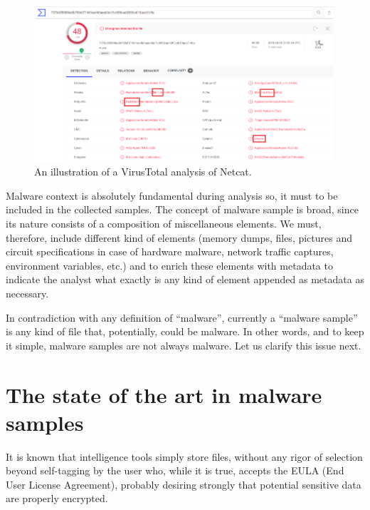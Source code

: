 \begin{figure}
  \centering
  \includegraphics[width=0.99\textwidth]{./figures/Image1.png}
  \caption{\label{fig:1} An illustration of a VirusTotal analysis of Netcat.}
\end{figure}

Malware context is absolutely fundamental during analysis\cite{ContextBasedMalware}\cite{LearningFromContext} so, it must to be
included in the collected samples. The concept of malware sample is broad,
since its nature consists of a composition of miscellaneous elements\cite{ResidentViruses}\cite{FilelessAttacks}\cite{AdvacedVolatileThreat}. We must,
therefore, include different kind of elements (memory dumps, files, pictures
and circuit specifications in case of hardware malware, network traffic
captures, environment variables, etc.) and to enrich these elements with
metadata to indicate the analyst what exactly is any kind of element
appended as metadata as necessary.

In contradiction with any definition of ``malware'', currently a ``malware
sample'' is any kind of file that, potentially, could be malware. In other
words, and to keep it simple, malware samples are not always malware. Let us
clarify this issue next.

\section{The state of the art in malware samples}
\label{sec:soa}

It is known that intelligence tools simply store files, without any rigor of
selection beyond self-tagging by the user who, while it is true, accepts the
EULA (End User License Agreement), probably desiring strongly that potential
sensitive data are properly encrypted.

